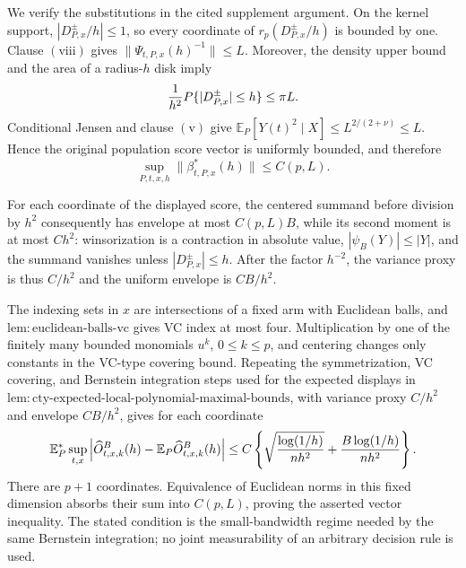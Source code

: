 We verify the substitutions in the cited supplement argument.  On the kernel support, \(|D^{\pm}_{P,x}/h|\leq1\), so every coordinate of \(r_p(D^{\pm}_{P,x}/h)\) is bounded by one.  Clause \(\mathrm{(viii)}\) gives \(\|\Psi_{t,P,x}(h)^{-1}\|\leq L\).  Moreover, the density upper bound and the area of a radius-\(h\) disk imply
\[
 {1\over h^2}P\{|D^{\pm}_{P,x}|\leq h\}\leq \pi L.
\]
Conditional Jensen and clause \(\mathrm{(v)}\) give \(\mathbb E_P[Y(t)^2\mid X]\leq L^{2/(2+\nu)}\leq L\).  Hence the original population score vector is uniformly bounded, and therefore
\[
 \sup_{P,t,x,h}\|\beta^*_{t,P,x}(h)\|\leq C(p,L).
\]

For each coordinate of the displayed score, the centered summand before division by \(h^2\) consequently has envelope at most \(C(p,L)B\), while its second moment is at most \(Ch^2\): winsorization is a contraction in absolute value, \(|\psi_B(Y)|\leq|Y|\), and the summand vanishes unless \(|D^{\pm}_{P,x}|\leq h\).  After the factor \(h^{-2}\), the variance proxy is thus \(C/h^2\) and the uniform envelope is \(CB/h^2\).

The indexing sets in \(x\) are intersections of a fixed arm with Euclidean balls, and \(\mathrm{lem:euclidean\text{-}balls\text{-}vc}\) gives VC index at most four.  Multiplication by one of the finitely many bounded monomials \(u^k\), \(0\leq k\leq p\), and centering changes only constants in the VC-type covering bound.  Repeating the symmetrization, VC covering, and Bernstein integration steps used for the expected displays in \(\mathrm{lem:cty\text{-}expected\text{-}local\text{-}polynomial\text{-}maximal\text{-}bounds}\), with variance proxy \(C/h^2\) and envelope \(CB/h^2\), gives for each coordinate
\[
 \mathbb E_P^*\sup_{t,x}
 \left|\widehat O^B_{t,x,k}(h)-\mathbb E_P\widehat O^B_{t,x,k}(h)\right|
 \leq C\left\{
 \sqrt{{\log(1/h)\over nh^2}}+{B\log(1/h)\over nh^2}
 \right\}.
\]
There are \(p+1\) coordinates.  Equivalence of Euclidean norms in this fixed dimension absorbs their sum into \(C(p,L)\), proving the asserted vector inequality.  The stated condition is the small-bandwidth regime needed by the same Bernstein integration; no joint measurability of an arbitrary decision rule is used.